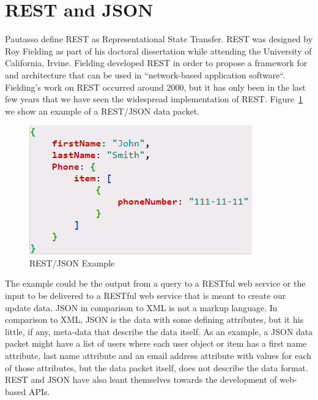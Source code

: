 \section{REST and JSON}
Pautasso\cite{hid505Pautasso2008} define REST as Representational State
Transfer.  REST was designed by Roy Fielding as part of his doctoral
dissertation while attending the University of California, Irvine\cite{hid505Fielding2000}.
Fielding developed REST in order to propose a framework for and architecture
that can be used in ``network-based application software``\cite{hid505Fielding2000}.
Fielding's work on REST occurred around 2000, but it has only been in the last
few years that we have seen the widespread implementation of REST.
Figure~\ref{f:rest-example} we show an example of a REST/JSON data packet.  
\begin{figure}[!ht]
  \centering\includegraphics[width=\columnwidth]{images/json-rest-example.png}
  \caption{REST/JSON Example}\label{f:rest-example}
\end{figure}
The example could be the output from a query to a RESTful web service or the 
input to be delivered to a RESTful web service that is meant to create our update 
data.  JSON in comparison to XML is not a markup language.  In comparison to XML, 
JSON is the data with some defining attributes, but it his little, if any, 
meta-data that describe the data itself.  As an example, a JSON data packet 
might have a list of users where each user object or item has a first name 
attribute, last name attribute and an email address attribute with values for 
each of those attributes, but the data packet itself, does not describe the data 
format.  REST and JSON have also leant themselves towards the development of 
web-based APIs.

